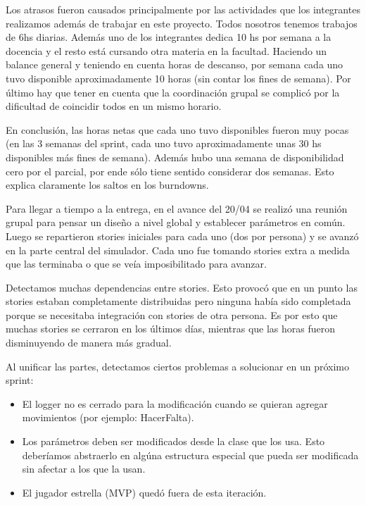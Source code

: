 Los atrasos fueron causados principalmente por las actividades que los integrantes realizamos además de trabajar en este proyecto. Todos
nosotros tenemos trabajos de 6hs diarias. Adem\'as uno de los integrantes dedica 10 hs por semana a la docencia y el resto est\'a cursando otra materia
en la facultad. Haciendo un balance general y teniendo en cuenta horas de descanso, por semana cada uno tuvo disponible aproximadamente 10 horas (sin
contar los fines de semana). Por último hay que tener en cuenta que la coordinación grupal se complicó por la dificultad de coincidir todos en un mismo
horario.

En conclusión, las horas netas que cada uno tuvo disponibles fueron muy pocas (en las 3 semanas del sprint, cada uno tuvo aproximadamente unas 30 hs
disponibles más fines de semana). Además hubo una semana de disponibilidad cero por el parcial, por ende sólo tiene sentido considerar
dos semanas. Esto explica claramente los saltos en los burndowns.

Para llegar a tiempo a la entrega, en el avance del 20/04 se realizó una reunión grupal para pensar un diseño a nivel global y establecer parámetros
en común. Luego se repartieron stories iniciales para cada uno (dos por persona) y se avanzó en la parte central del simulador. Cada uno fue tomando
stories extra a medida que las terminaba o que se veía imposibilitado para avanzar.

Detectamos muchas dependencias entre stories. Esto provocó que en un punto las stories estaban completamente distribuidas pero ninguna había sido
completada porque se necesitaba integración con stories de otra persona. Es por esto que muchas stories se cerraron en los últimos días, mientras
que las horas fueron disminuyendo de manera más gradual.

Al unificar las partes, detectamos ciertos problemas a solucionar en un próximo sprint:
\begin{itemize}
 \item El logger no es cerrado para la modificación cuando se quieran agregar movimientos (por ejemplo: HacerFalta).
 \item Los parámetros deben ser modificados desde la clase que los usa. Esto deberíamos abstraerlo en algúna estructura especial que pueda
 ser modificada sin afectar a los que la usan.
 \item El jugador estrella (MVP) quedó fuera de esta iteración.
\end{itemize}
